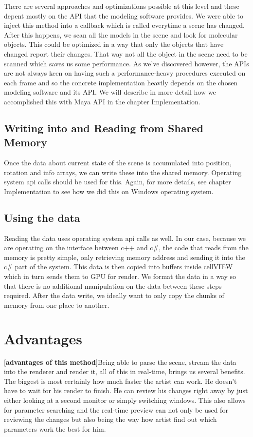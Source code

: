\documentclass[
  digital, %
  table,   %
  nolof,     %
  nolot,     %
]{fithesis3}
\begin{document}
There are several approaches and optimizations possible at this level and these depent mostly on the API that the modeling software provides. We were able to inject this method into a callback which is called everytime a scene has changed. After this happens, we scan all the models in the scene and look for molecular objects. This could be optimized in a way that only the objects that have changed report their changes. That way not all the object in the scene need to be scanned which saves us some performance. As we've discovered however, the APIs are not always keen on having such a performance-heavy procedures executed on each frame and so the concrete implementation heavily depends on the chosen modeling software and its API. We will describe in more detail how we accomplished this with Maya API in the chapter Implementation.

\subsection{Writing into and Reading from Shared Memory}
Once the data about current state of the scene is accumulated into position, rotation and info arrays, we can write these into the shared memory. Operating system api calls should be used for this. Again, for more details, see chapter Implementation to see how we did this on Windows operating system.

\subsection{Using the data}
Reading the data uses operating system api calls as well. In our case, because we are operating on the interface between c++ and c\#, the code that reads from the memory is pretty simple, only retrieving memory address and sending it into the c\# part of the system. This data is then copied into buffers inside cellVIEW which in turn sends them to GPU for render. We format the data in a way so that there is no additional manipulation on the data between these steps required. After the data write, we ideally want to only copy the chunks of memory from one place to another.

\section{Advantages}
[\textbf{advantages of this method}]Being able to parse the scene, stream the data into the renderer and render it, all of this in real-time, brings us several benefits. The biggest is most certainly how much faster the artist can work. He doesn't have to wait for his render to finish. He can review his changes right away by just either looking at a second monitor or simply switching windows. This also allows for parameter searching and the real-time preview can not only be used for reviewing the changes but also being the way how artist find out which parameters work the best for him.
\end{document}
